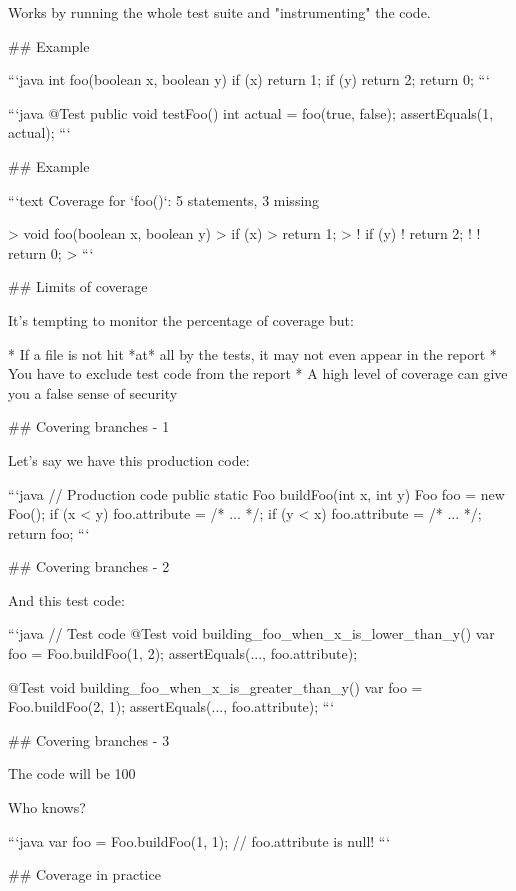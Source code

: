 Works by running the whole test suite and "instrumenting" the code.

## Example

```java
int foo(boolean x, boolean y) {
    if (x) {
        return 1;
    }
    if (y) {
        return 2;
    }
    return 0;
}
```

\vfill

```java
@Test
public void testFoo() {
    int actual = foo(true, false);
    assertEquals(1, actual);
}
```

## Example

```text
Coverage for `foo()`: 5 statements, 3 missing

> void foo(boolean x, boolean y) {
>     if (x) {
>         return 1;
>     }
!     if (y) {
!         return 2;
!     }
!     return 0;
> }
```

## Limits of coverage

It's tempting to monitor the percentage of coverage but:

* If a file is not hit *at* all by the tests, it may not even appear in the report
* You have to exclude test code from the report
* A high level of coverage can give you a false sense of security

## Covering branches - 1

Let's say we have this production code:

```java
// Production code
public static Foo buildFoo(int x, int y) {
    Foo foo = new Foo();
    if (x < y) {
        foo.attribute = /* ... */;
    }
    if (y < x) {
        foo.attribute = /* ... */;
    }
    return foo;
}
```

## Covering branches - 2

And this test code:

```java
// Test code
@Test
void building_foo_when_x_is_lower_than_y() {
    var foo = Foo.buildFoo(1, 2);
    assertEquals(..., foo.attribute);
}

@Test
void building_foo_when_x_is_greater_than_y() {
    var foo = Foo.buildFoo(2, 1);
    assertEquals(..., foo.attribute);
}
```

## Covering branches - 3

The code will be 100%

\vfill

Who knows?

```java
var foo = Foo.buildFoo(1, 1);
// foo.attribute is null!
```

## Coverage in practice

